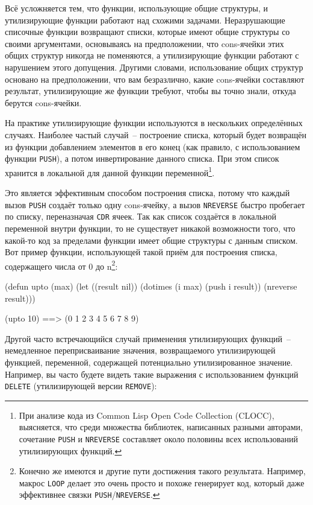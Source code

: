 Всё усложняется тем, что функции, использующие общие структуры, и утилизирующие функции
работают над схожими задачами. Неразрушающие списочные функции возвращают списки,
которые имеют общие структуры со своими аргументами, основываясь на предположении, что
cons-ячейки этих общих структур никогда не поменяются, а утилизирующие функции работают с
нарушением этого допущения. Другими словами, использование общих структур основано на
предположении, что вам безразлично, какие cons-ячейки составляют результат, утилизирующие
же функции требуют, чтобы вы точно знали, откуда берутся cons-ячейки.

На практике утилизирующие функции используются в нескольких определённых
случаях. Наиболее частый случай~-- построение списка, который будет возвращён из функции
добавлением элементов в его конец (как правило, с использованием функции \lstinline{PUSH}), а
потом инвертирование данного списка. При этом список хранится в локальной для данной
функции переменной\footnote{При анализе кода из Common Lisp Open Code Collection
  (CLOCC), выясняется, что среди множества библиотек, написанных разными авторами,
  сочетание \lstinline{PUSH} и \lstinline{NREVERSE} составляет около половины всех использований
  утилизирующих функций.}\hspace{\footnotenegspace}.

Это является эффективным способом построения списка, потому что каждый вызов \lstinline{PUSH}
создаёт только одну cons-ячейку, а вызов \lstinline{NREVERSE} быстро пробегает по списку,
переназначая \lstinline{CDR} ячеек. Так как список создаётся в локальной переменной внутри
функции, то не существует никакой возможности того, что какой-то код за пределами функции имеет общие
структуры с данным списком. Вот пример функции, использующей такой приём для
построения списка, содержащего числа от 0 до n\footnote{Конечно же имеются и другие
  пути достижения такого результата. Например, макрос \lstinline{LOOP} делает это очень просто
  и похоже генерирует код, который даже эффективнее связки \lstinline{PUSH}/\lstinline{NREVERSE}.}\hspace{\footnotenegspace}:

\begin{myverb}
(defun upto (max)
  (let ((result nil))
    (dotimes (i max)
      (push i result))
    (nreverse result)))

(upto 10) ==> (0 1 2 3 4 5 6 7 8 9)
\end{myverb}

Другой часто встречающийся случай применения утилизирующих функций~-- немедленное переприсваивание значения, возвращаемого утилизирующей функцией,
переменной, содержащей потенциально утилизированное значение. Например, вы часто будете
видеть такие выражения с использованием функций \lstinline{DELETE} (утилизирующей версии
\lstinline{REMOVE}):

